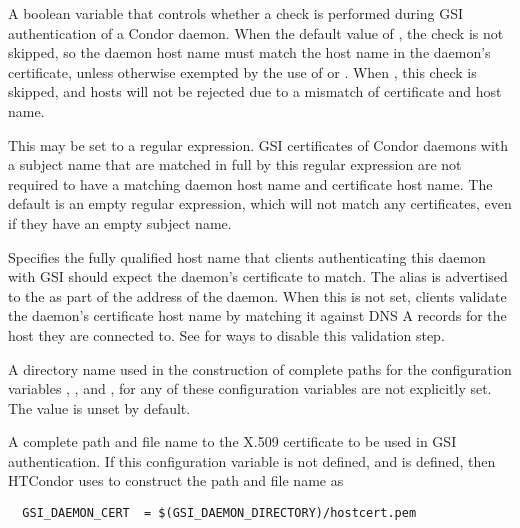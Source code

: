 \begin{description}
\label{param:GSISkipHostCheck}
\item[\Macro{GSI\_SKIP\_HOST\_CHECK}]
  A boolean variable that controls whether a check is performed during
  GSI authentication of a Condor daemon.  
  When the default value of ,
  the check is not skipped, so the daemon host name must match the
  host name in the daemon's certificate, 
  unless otherwise exempted by the use of  or
  .
  When , this check is skipped, and hosts will not be rejected
  due to a mismatch of certificate and host name.

\label{param:GSISkipHostCheckCertRegex}
\item[\Macro{GSI\_SKIP\_HOST\_CHECK\_CERT\_REGEX}]
  This may be set to a regular expression.  GSI certificates of Condor
  daemons with a subject name that are matched in full by this regular
  expression are not required to have a matching daemon host name and
  certificate host name.  
  The default is an empty regular expression,
  which will not match any certificates,
  even if they have an empty subject name.

\label{param:HostAlias}
\item[\Macro{HOST\_ALIAS}] Specifies the fully qualified
  host name that clients authenticating this daemon with GSI should
  expect the daemon's certificate to match.  The alias is advertised
  to the  as part of the address of the daemon.
  When this is not set, clients validate the daemon's certificate
  host name by matching it against DNS A records for the host they
  are connected to.  See  for ways
  to disable this validation step.

\label{param:GSIDaemonDirectory}
\item[\Macro{GSI\_DAEMON\_DIRECTORY}]
  A directory name used in the
  construction of complete paths for the configuration variables
  ,
  , and
  ,
  for any of these configuration variables are not explicitly set.
  The value is unset by default. 

\label{param:GSIDaemonCert}
\item[\Macro{GSI\_DAEMON\_CERT}]
  A complete path and file name to the
  X.509 certificate to be used in GSI authentication.
  If this configuration variable is not defined, and
   is defined, then HTCondor uses
   to construct the path and file name as
  \begin{verbatim}
  GSI_DAEMON_CERT  = $(GSI_DAEMON_DIRECTORY)/hostcert.pem
  \end{verbatim}


\end{description}
